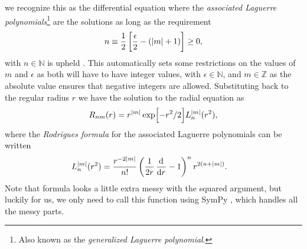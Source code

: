         we recognize this as the differential equation where the
        \emph{associated Laguerre polynomials}\footnote{%
            Also known as the \emph{generalized Laguerre polynomial}.
        } are the solutions as long as the requirement
        \begin{align}
            n \equiv \frac{1}{2}\left[ 
                \frac{\epsilon}{2}
                - (\abs{m} + 1)
             \right] \geq 0,
        \end{align}
        with $n \in \mathbb{N}$ is upheld \cite{laguerre-polynomials}.
        This automatically sets some restrictions on the values of $m$ and
        $\epsilon$ as both will have to have integer values, with $\epsilon \in
        \mathbb{N}$, and $m \in \mathbb{Z}$ as the absolute value ensures that
        negative integers are allowed.
        Substituting back to the regular radius $r$ we have the solution to the
        radial equation as
        \begin{align}
            R_{nm}(r)
            = r^{\abs{m}} \exp[-r^2 / 2]
            L^{\abs{m}}_{n}(r^2),
        \end{align}
        where the \emph{Rodrigues formula} for the associated Laguerre
        polynomials can be written
        \begin{align}
            L^{\abs{m}}_{n}(r^2)
            &= \frac{r^{-2\abs{m}}}{n!}
            \para{
                \frac{1}{2r}
                \dod{}{r}
                - 1
            }^{n}
            r^{2(n + \abs{m})}.
        \end{align}
        Note that formula looks a little extra messy with the squared argument,
        but luckily for us, we only need to call this function using SymPy
        \cite{sympy}, which handles all the messy parts.

